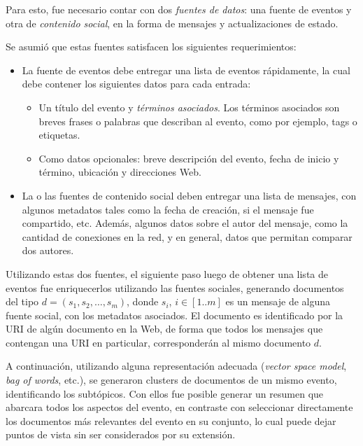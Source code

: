 \documentclass[upright, contnum]{umemoria}
\begin{document}
   Para esto, fue necesario contar con dos \emph{fuentes de datos}: una
   fuente de eventos y otra de \emph{contenido social}, en la forma de
   mensajes y actualizaciones de estado.  

   Se asumió que estas fuentes satisfacen los siguientes
   requerimientos:

\begin{itemize}
\item La fuente de eventos debe entregar una lista de eventos
     rápidamente, la cual debe contener los siguientes datos para
     cada entrada:

\begin{itemize}
\item Un título del evento y \emph{términos asociados}. Los términos
       asociados son breves frases o palabras que describan al
       evento, como por ejemplo, tags o etiquetas.
\item Como datos opcionales: breve descripción del evento, fecha de
       inicio y término, ubicación y direcciones Web.
\end{itemize}

\item La o las fuentes de contenido social deben entregar una lista de
     mensajes, con algunos metadatos tales como la fecha de creación,
     si el mensaje fue compartido, etc. Además, algunos datos sobre el
     autor del mensaje, como la cantidad de conexiones en la red, y
     en general, datos que permitan comparar dos autores.
\end{itemize}
   Utilizando estas dos fuentes, el siguiente paso luego de obtener
   una lista de eventos fue enriquecerlos utilizando las fuentes
   sociales, generando documentos del tipo 
   $d = (s_1, s_2, \ldots, s_m)$, donde  $s_i$, $i \in [1..m]$ 
   es un mensaje de alguna fuente social, con los
   metadatos asociados. El documento es identificado por la URI de
   algún documento en la Web, de forma que todos los mensajes que
   contengan una URI en particular, corresponderán al mismo documento
   $d$.

   A continuación, utilizando alguna representación adecuada 
   (\emph{vector space model}, \emph{bag of words}, etc.), se generaron clusters
   de documentos de un mismo evento, identificando los subtópicos. Con
   ellos fue posible generar un resumen que abarcara todos los
   aspectos del evento, en contraste con seleccionar directamente los
   documentos más relevantes del evento en su conjunto, lo cual puede
   dejar puntos de vista sin ser considerados por su extensión. 
\end{document}
